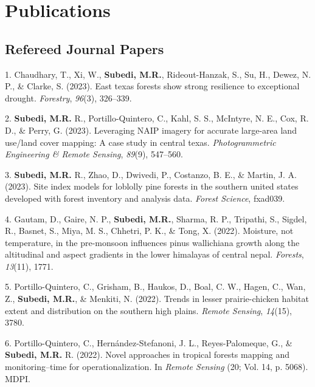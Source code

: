 \documentclass[11pt,a4paper,]{awesome-cv}
\newlength{\cslhangindent}
\newenvironment{CSLReferences}[2] %
 {\begin{list}{}{%
  \setlength{\itemindent}{0pt}
  \setlength{\leftmargin}{0pt}
  \setlength{\parsep}{0pt}
  \ifodd #1
   \setlength{\leftmargin}{\cslhangindent}
   \setlength{\itemindent}{-1\cslhangindent}
  \fi
  \setlength{\itemsep}{#2\baselineskip}}}
 {\end{list}}
\begin{document}
\section{Publications}\label{publications}

\subsection{Refereed Journal Papers}\label{refereed-journal-papers}

\label{refs-042a5607f0aa86a02828f64c32305b25}
\begin{CSLReferences}{1}{0}
1. Chaudhary, T., Xi, W., \textbf{Subedi, M.R.}, Rideout-Hanzak, S., Su,
H., Dewez, N. P., \& Clarke, S. (2023). East texas forests show strong
resilience to exceptional drought. \emph{Forestry}, \emph{96}(3),
326--339.

2. \textbf{Subedi, M.R.} R., Portillo-Quintero, C., Kahl, S. S.,
McIntyre, N. E., Cox, R. D., \& Perry, G. (2023). Leveraging NAIP
imagery for accurate large-area land use/land cover mapping: A case
study in central texas. \emph{Photogrammetric Engineering \& Remote
Sensing}, \emph{89}(9), 547--560.

3. \textbf{Subedi, M.R.} R., Zhao, D., Dwivedi, P., Costanzo, B. E., \&
Martin, J. A. (2023). Site index models for loblolly pine forests in the
southern united states developed with forest inventory and analysis
data. \emph{Forest Science}, fxad039.

4. Gautam, D., Gaire, N. P., \textbf{Subedi, M.R.}, Sharma, R. P.,
Tripathi, S., Sigdel, R., Basnet, S., Miya, M. S., Chhetri, P. K., \&
Tong, X. (2022). Moisture, not temperature, in the pre-monsoon
influences pinus wallichiana growth along the altitudinal and aspect
gradients in the lower himalayas of central nepal. \emph{Forests},
\emph{13}(11), 1771.

5. Portillo-Quintero, C., Grisham, B., Haukos, D., Boal, C. W., Hagen,
C., Wan, Z., \textbf{Subedi, M.R.}, \& Menkiti, N. (2022). Trends in
lesser prairie-chicken habitat extent and distribution on the southern
high plains. \emph{Remote Sensing}, \emph{14}(15), 3780.

6. Portillo-Quintero, C., Hernández-Stefanoni, J. L., Reyes-Palomeque,
G., \& \textbf{Subedi, M.R.} R. (2022). Novel approaches in tropical
forests mapping and monitoring--time for operationalization. In
\emph{Remote Sensing} (20; Vol. 14, p. 5068). MDPI.


\end{CSLReferences}
\end{document}
